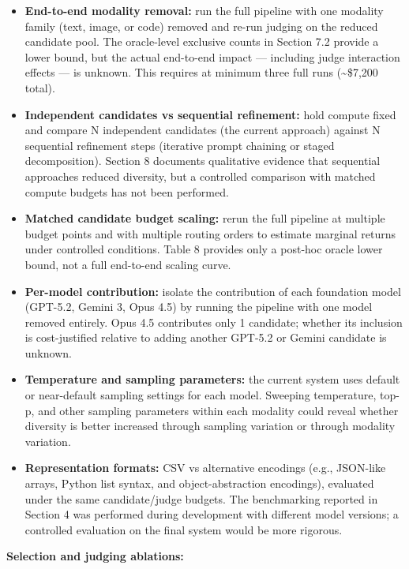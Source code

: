 \documentclass[11pt]{article}
\providecommand{\tightlist}{%
  \setlength{\itemsep}{0pt}\setlength{\parskip}{0pt}}
\begin{document}
\begin{itemize}
\tightlist
\item
  \textbf{End-to-end modality removal:} run the full pipeline with one
  modality family (text, image, or code) removed and re-run judging on
  the reduced candidate pool. The oracle-level exclusive counts in
  Section 7.2 provide a lower bound, but the actual end-to-end impact
  --- including judge interaction effects --- is unknown. This requires
  at minimum three full runs (\textasciitilde\$7,200 total).
\item
  \textbf{Independent candidates vs sequential refinement:} hold compute
  fixed and compare N independent candidates (the current approach)
  against N sequential refinement steps (iterative prompt chaining or
  staged decomposition). Section 8 documents qualitative evidence that
  sequential approaches reduced diversity, but a controlled comparison
  with matched compute budgets has not been performed.
\item
  \textbf{Matched candidate budget scaling:} rerun the full pipeline at
  multiple budget points and with multiple routing orders to estimate
  marginal returns under controlled conditions. Table 8 provides only a
  post-hoc oracle lower bound, not a full end-to-end scaling curve.
\item
  \textbf{Per-model contribution:} isolate the contribution of each
  foundation model (GPT-5.2, Gemini 3, Opus 4.5) by running the pipeline
  with one model removed entirely. Opus 4.5 contributes only 1
  candidate; whether its inclusion is cost-justified relative to adding
  another GPT-5.2 or Gemini candidate is unknown.
\item
  \textbf{Temperature and sampling parameters:} the current system uses
  default or near-default sampling settings for each model. Sweeping
  temperature, top-p, and other sampling parameters within each modality
  could reveal whether diversity is better increased through sampling
  variation or through modality variation.
\item
  \textbf{Representation formats:} CSV vs alternative encodings (e.g.,
  JSON-like arrays, Python list syntax, and object-abstraction
  encodings), evaluated under the same candidate/judge budgets. The
  benchmarking reported in Section 4 was performed during development
  with different model versions; a controlled evaluation on the final
  system would be more rigorous.
\end{itemize}

\textbf{Selection and judging ablations:}
\end{document}
